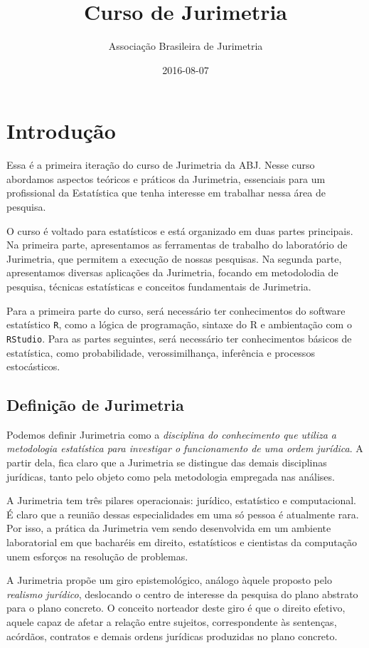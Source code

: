 \documentclass[]{book}
\title{Curso de Jurimetria}
\author{Associação Brasileira de Jurimetria}
\date{2016-08-07}
\begin{document}
\maketitle

{
\setcounter{tocdepth}{1}
\tableofcontents
}
\chapter{Introdução}\label{introducao}

Essa é a primeira iteração do curso de Jurimetria da ABJ. Nesse curso
abordamos aspectos teóricos e práticos da Jurimetria, essenciais para um
profissional da Estatística que tenha interesse em trabalhar nessa área
de pesquisa.

O curso é voltado para estatísticos e está organizado em duas partes
principais. Na primeira parte, apresentamos as ferramentas de trabalho
do laboratório de Jurimetria, que permitem a execução de nossas
pesquisas. Na segunda parte, apresentamos diversas aplicações da
Jurimetria, focando em metodolodia de pesquisa, técnicas estatísticas e
conceitos fundamentais de Jurimetria.

Para a primeira parte do curso, será necessário ter conhecimentos do
software estatístico \texttt{R}, como a lógica de programação, sintaxe
do R e ambientação com o \texttt{RStudio}. Para as partes seguintes,
será necessário ter conhecimentos básicos de estatística, como
probabilidade, verossimilhança, inferência e processos estocásticos.

\section{Definição de Jurimetria}\label{definicao-de-jurimetria}

Podemos definir Jurimetria como a \emph{disciplina do conhecimento que
utiliza a metodologia estatística para investigar o funcionamento de uma
ordem jurídica}. A partir dela, fica claro que a Jurimetria se distingue
das demais disciplinas jurídicas, tanto pelo objeto como pela
metodologia empregada nas análises.

A Jurimetria tem três pilares operacionais: jurídico, estatístico e
computacional. É claro que a reunião dessas especialidades em uma só
pessoa é atualmente rara. Por isso, a prática da Jurimetria vem sendo
desenvolvida em um ambiente laboratorial em que bacharéis em direito,
estatísticos e cientistas da computação unem esforços na resolução de
problemas.

A Jurimetria propõe um giro epistemológico, análogo àquele proposto pelo
\emph{realismo jurídico}, deslocando o centro de interesse da pesquisa
do plano abstrato para o plano concreto. O conceito norteador deste giro
é que o direito efetivo, aquele capaz de afetar a relação entre
sujeitos, correspondente às sentenças, acórdãos, contratos e demais
ordens jurídicas produzidas no plano concreto.
\end{document}
